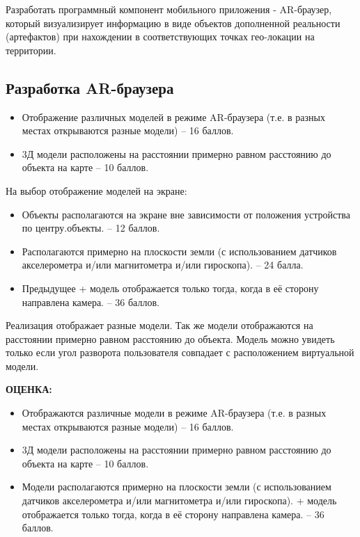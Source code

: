 
Разработать программный компонент мобильного приложения - AR-браузер, который визуализирует информацию в виде объектов дополненной реальности (артефактов) при нахождении в соответствующих точках гео-локации на территории.

\subsection*{Разработка AR-браузера}

\markSection
\begin{itemize}
    \item	Отображение различных моделей в режиме AR-браузера (т.е. в разных местах открываются разные модели) – 16 баллов.
    \item	3Д модели расположены на расстоянии примерно равном расстоянию до объекта на карте – 10 баллов.
\end{itemize}
На выбор отображение моделей на экране:
\begin{itemize}
    \item	Объекты располагаются на экране вне зависимости от положения устройства по центру.объекты. – 12 баллов.
    \item	Располагаются примерно на плоскости земли (с использованием датчиков акселерометра и/или магнитометра и/или гироскопа). – 24 балла.
    \item	Предыдущее + модель отображается только тогда, когда в её сторону направлена камера. – 36 баллов.
\end{itemize}

\solutionSection
Реализация отображает разные модели. Так же модели отображаются на расстоянии примерно равном расстоянию до объекта. 
Модель можно увидеть только если угол разворота пользователя совпадает с расположением виртуальной модели.


\textbf{ОЦЕНКА:}
\begin{itemize}
    \item	Отображаются различные модели в режиме AR-браузера (т.е. в разных местах открываются разные модели) – 16 баллов.
    \item	3Д модели расположены на расстоянии примерно равном расстоянию до объекта на карте – 10 баллов.
    \item	Модели располагаются примерно на плоскости земли (с использованием датчиков акселерометра и/или магнитометра и/или гироскопа). + модель отображается только тогда, когда в её сторону направлена камера. – 36 баллов.
\end{itemize}